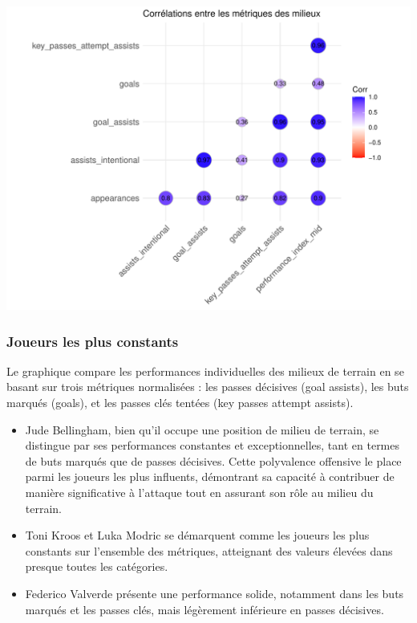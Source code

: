 \documentclass[
  6pt,
]{article}
\begin{document}
\begin{center}\includegraphics[width=0.8\linewidth]{Analyse_Impact_Performances_Joueurs_files/figure-latex/Correlations-mid-1} \end{center}

\subsubsection{Joueurs les plus
constants}\label{joueurs-les-plus-constants}

Le graphique compare les performances individuelles des milieux de
terrain en se basant sur trois métriques normalisées : les passes
décisives (goal assists), les buts marqués (goals), et les passes clés
tentées (key passes attempt assists).

\begin{itemize}
\item
  Jude Bellingham, bien qu'il occupe une position de milieu de terrain,
  se distingue par ses performances constantes et exceptionnelles, tant
  en termes de buts marqués que de passes décisives. Cette polyvalence
  offensive le place parmi les joueurs les plus influents, démontrant sa
  capacité à contribuer de manière significative à l'attaque tout en
  assurant son rôle au milieu du terrain.
\item
  Toni Kroos et Luka Modric se démarquent comme les joueurs les plus
  constants sur l'ensemble des métriques, atteignant des valeurs élevées
  dans presque toutes les catégories.
\item
  Federico Valverde présente une performance solide, notamment dans les
  buts marqués et les passes clés, mais légèrement inférieure en passes
  décisives.
\end{itemize}
\end{document}
